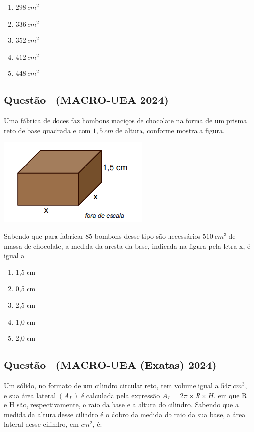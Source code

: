 \documentclass[12pt]{article}
\newcounter{questao}
\newcommand{\novaquestao}[1]{%
  \stepcounter{questao}%
  \subsection*{Questão \thequestao\ (#1)}%
}
\begin{document}
\begin{multicols}{2}
            \begin{enumerate}[label=(\alph*), noitemsep]
                \item {$298\ cm^{2}$} %
                \item $336\ cm^{2}$
                \item $352\ cm^{2}$
                \item $412\ cm^{2}$
                \item $448\ cm^{2}$
            \end{enumerate}
            
        \novaquestao{MACRO-UEA 2024}
            Uma fábrica de doces faz bombons maciços de chocolate na forma de um prisma reto de base quadrada e com $1,5\ cm$ de altura, conforme mostra a figura.

            \begin{center}
                \includegraphics[scale=0.6]{imagem/q24.png}
            \end{center} Sabendo que para fabricar 85 bombons desse tipo são necessários $510\ cm^{3}$ de massa de chocolate, a medida da aresta da base, indicada na figura pela letra x, é igual a
        
            \begin{enumerate}[label=(\alph*), noitemsep]
                \item 1,5  cm
                \item 0,5  cm
                \item 2,5  cm
                \item 1,0  cm
                \item {2,0  cm} %
            \end{enumerate}

        \novaquestao{MACRO-UEA (Exatas) 2024}

            Um sólido, no formato de um cilindro circular reto, tem volume igual a $54\pi\ cm^{3}$, e sua área lateral $(A_{L})$ é calculada pela expressão $A_{L}=2\pi \times R \times H$, em que R e H são, respectivamente, o raio da base e a altura do cilindro. Sabendo que a medida da altura desse cilindro é o dobro da medida do raio da sua base, a área lateral desse cilindro, em $cm^{2}$, é:
            

\end{multicols}
\end{document}
